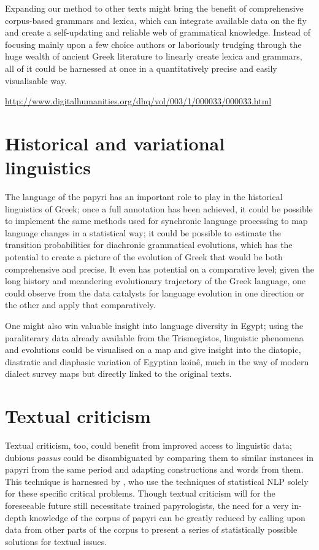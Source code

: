 Expanding our method to other texts might bring the benefit of comprehensive
corpus-based grammars and lexica, which can integrate available data on the fly
and create a self-updating and reliable web of grammatical knowledge. Instead
of focusing mainly upon a few choice authors or laboriously trudging through
the huge wealth of ancient Greek literature to linearly create lexica and
grammars, all of it could be harnessed at once in a quantitatively precise and
easily visualisable way.

\url{http://www.digitalhumanities.org/dhq/vol/003/1/000033/000033.html}

\section{Historical and variational linguistics} %
\label{sec:histlinguistics}

The language of the papyri has an important role to play in the historical
linguistics of Greek; once a full annotation has been achieved, it could be
possible to implement the same methods used for synchronic language processing
to map language changes in a statistical way; it could be possible to estimate
the transition probabilities for diachronic grammatical evolutions, which has
the potential to create a picture of the evolution of Greek that would be both
comprehensive and precise. It even has potential on a comparative level; given
the long history and meandering evolutionary trajectory of the Greek language,
one could observe from the data catalysts for language evolution in one
direction or the other and apply that comparatively.

One might also win valuable insight into language diversity in Egypt; using the
paraliterary data already available from the Trismegistos, linguistic phenomena
and evolutions could be visualised on a map and give insight into the diatopic,
diastratic and diaphasic variation of Egyptian koin\^e, much in the way of
modern dialect survey maps but directly linked to the original texts.

\section{Textual criticism}
\label{sec:textualcriticism}

Textual criticism, too, could benefit from improved access to linguistic data;
dubious \textit{passus} could be disambiguated by comparing them to similar
instances in papyri from the same period and adapting constructions and words
from them.  This technique is harnessed by \citet{mimno2009}, who use the
techniques of statistical NLP solely for these specific critical problems.
Though textual criticism will for the foreseeable future still necessitate
trained papyrologists, the need for a very in-depth knowledge of the corpus of
papyri can be greatly reduced by calling upon data from other parts of the
corpus to present a series of statistically possible solutions for textual
issues.

